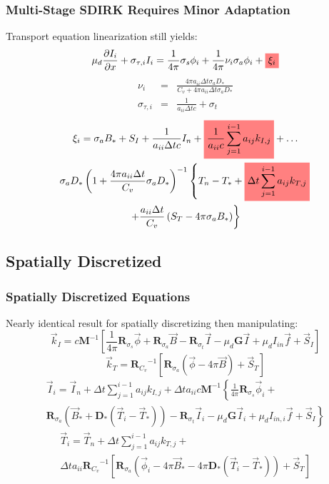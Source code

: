 \documentclass{beamer}
\newcommand{\highlight}[1]{%
  \colorbox{red!50}{$\displaystyle#1$}}
\newcommand{\be}{\begin{equation*}}   %
\newcommand{\ee}{\end{equation*}}
\newcommand{\bea}{\begin{eqnarray*}}  %
\newcommand{\eea}{\end{eqnarray*}}
\newcommand{\R}[1]{\ensuremath{\mathbf{R}_{#1}}}
\newcommand{\D}{\ensuremath{ \mathbf{D}_* }}
\newcommand{\M}{\ensuremath{ \mathbf M}}
\begin{document}
\begin{frame}
\frametitle{Multi-Stage SDIRK Requires Minor Adaptation}
Transport equation linearization still yields:\
\be
\mu_d \frac{\partial I_i}{\partial x} + \sigma_{\tau,i}I_i = \frac{1}{4\pi} \sigma_s \phi_i + \frac{1}{4\pi}\nu_i \sigma_a \phi_i + \highlight{ \xi_i} 
\ee
\vspace{-0.2in}
\small
\bea
\nu_i &=&  \frac{ 4\pi a_{ii} \Delta t \sigma_a D_*}{C_v + 4\pi a_{ii} \Delta t  \sigma_a D_*} \\
\sigma_{\tau,i} &=& \frac{1}{a_{ii} \Delta t c} + \sigma_t
\eea
\vspace{-0.2in}
\begin{multline*}
\xi_i = \sigma_a B_* + S_I +  \frac{1}{a_{ii} \Delta t c} I_n + \highlight{ \frac{1}{a_{ii} c} \sum_{j=1}^{i-1}{a_{ij} k_{I,j}} }  + \dots  \\ 
\sigma_a D_*\left(1 + \frac{4\pi a_{ii} \Delta t}{C_v} \sigma_a D_*  \right)^{-1} 
\left \{ T_n - T_* + \highlight{ \Delta t \sum_{j=1}^{i-1}{a_{ij} k_{T,j}} } \right. \\
\left. +   \frac{a_{ii} \Delta t }{C_v}  \left( S_T -  4\pi  \sigma_a B_*   \right) \right \}
\end{multline*}
\end{frame}

\subsection{Spatially Discretized}
\begin{frame}
\frametitle{Spatially Discretized Equations}
Nearly identical result for spatially discretizing then manipulating:
\be
\vec{k}_{I}= c \M^{-1} 
\left[
\frac{1}{4\pi}\R{\sigma_s}\vec{\phi} + \R{\sigma_a}\vec{B} - \R{\sigma_t} \vec{I} - \mu_d\mathbf{G}\vec{I} + \mu_d I_{in} \vec{f}+ \vec{S}_I
\right]
\ee
\be
\vec{k}_T =  \R{C_v}^{-1}
\left[ \R{\sigma_a} \left(\vec{\phi} - 4\pi\vec{B} \right) + \vec{S}_T \right] 
\ee
\vspace{-0.1in}
\begin{multline*}
\vec{I}_i = \vec{I}_n + \Delta t \sum_{j=1}^{i-1}{a_{ij} k_{I,j}   } + 
\Delta t a_{ii} c \M^{-1}\left \{ \frac{1}{4\pi}\R{\sigma_s}\vec{\phi}_i + \right. \\
\left. \R{\sigma_a}\left(\vec{B}_* + \D \left(\vec{T}_i -\vec{T}_*  \right)   \right)- \R{\sigma_t} \vec{I}_i - \mu_d \mathbf{G}\vec{I}_i + \mu_d I_{in,i} \vec{f}+ \vec{S}_I
\right\}
\end{multline*}
\vspace{-0.1in}
\begin{multline*}
\vec{T}_i = \vec{T}_n + \Delta t \sum_{j=1}^{i-1}{a_{ij} k_{T,j}   } + \\
\Delta t a_{ii}\R{C_v}^{-1}\left[
\R{\sigma_a}\left(\vec{\phi}_i - 4\pi\vec{B}_* - 4\pi\D\left( \vec{T}_i - \vec{T}_* \right)\right) + \vec{S}_T 
\right] 
\end{multline*}

\end{frame}
\end{document}
